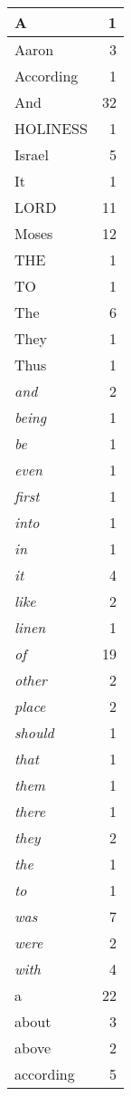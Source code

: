 \begin{center}
\begin{longtable}{l|r}
\hline \hline
\endlastfoot
A & 1 \\ \hline
Aaron & 3 \\ \hline
According & 1 \\ \hline
And & 32 \\ \hline
HOLINESS & 1 \\ \hline
Israel & 5 \\ \hline
It & 1 \\ \hline
LORD & 11 \\ \hline
Moses & 12 \\ \hline
THE & 1 \\ \hline
TO & 1 \\ \hline
The & 6 \\ \hline
They & 1 \\ \hline
Thus & 1 \\ \hline
\emph{and} & 2 \\ \hline
\emph{being} & 1 \\ \hline
\emph{be} & 1 \\ \hline
\emph{even} & 1 \\ \hline
\emph{first} & 1 \\ \hline
\emph{into} & 1 \\ \hline
\emph{in} & 1 \\ \hline
\emph{it} & 4 \\ \hline
\emph{like} & 2 \\ \hline
\emph{linen} & 1 \\ \hline
\emph{of} & 19 \\ \hline
\emph{other} & 2 \\ \hline
\emph{place} & 2 \\ \hline
\emph{should} & 1 \\ \hline
\emph{that} & 1 \\ \hline
\emph{them} & 1 \\ \hline
\emph{there} & 1 \\ \hline
\emph{they} & 2 \\ \hline
\emph{the} & 1 \\ \hline
\emph{to} & 1 \\ \hline
\emph{was} & 7 \\ \hline
\emph{were} & 2 \\ \hline
\emph{with} & 4 \\ \hline
a & 22 \\ \hline
about & 3 \\ \hline
above & 2 \\ \hline
according & 5 \\ \hline

\end{longtable}
\end{center}
